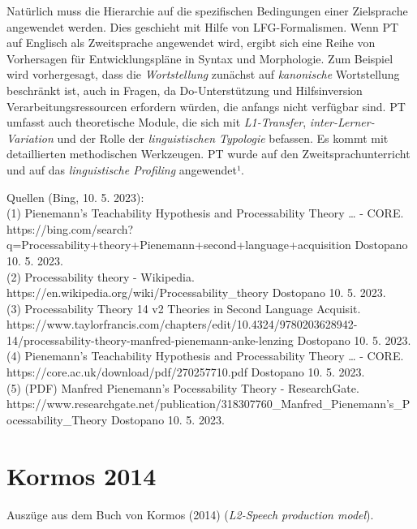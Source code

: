 \documentclass[
  letterpaper,
]{scrbook}
\begin{document}
Natürlich muss die Hierarchie auf die spezifischen Bedingungen einer
Zielsprache angewendet werden. Dies geschieht mit Hilfe von
LFG-Formalismen. Wenn PT auf Englisch als Zweitsprache angewendet wird,
ergibt sich eine Reihe von Vorhersagen für Entwicklungspläne in Syntax
und Morphologie. Zum Beispiel wird vorhergesagt, dass die
\emph{Wortstellung} zunächst auf \emph{kanonische} Wortstellung
beschränkt ist, auch in Fragen, da Do-Unterstützung und Hilfsinversion
Verarbeitungsressourcen erfordern würden, die anfangs nicht verfügbar
sind. PT umfasst auch theoretische Module, die sich mit
\emph{L1-Transfer}, \emph{inter-Lerner-Variation} und der Rolle der
\emph{linguistischen Typologie} befassen. Es kommt mit detaillierten
methodischen Werkzeugen. PT wurde auf den Zweitsprachunterricht und auf
das \emph{linguistische Profiling} angewendet¹.

Quellen (Bing, 10. 5. 2023):\\
(1) Pienemann's Teachability Hypothesis and Processability Theory
\ldots{} - CORE.
https://bing.com/search?q=Processability+theory+Pienemann+second+language+acquisition
Dostopano 10. 5. 2023.\\
(2) Processability theory - Wikipedia.
https://en.wikipedia.org/wiki/Processability\_theory Dostopano 10. 5.
2023.\\
(3) Processability Theory \textbar{} 14 \textbar{} v2 \textbar{}
Theories in Second Language Acquisit.
https://www.taylorfrancis.com/chapters/edit/10.4324/9780203628942-14/processability-theory-manfred-pienemann-anke-lenzing
Dostopano 10. 5. 2023.\\
(4) Pienemann's Teachability Hypothesis and Processability Theory
\ldots{} - CORE. https://core.ac.uk/download/pdf/270257710.pdf Dostopano
10. 5. 2023.\\
(5) (PDF) Manfred Pienemann's Pocessability Theory - ResearchGate.
https://www.researchgate.net/publication/318307760\_Manfred\_Pienemann's\_Pocessability\_Theory
Dostopano 10. 5. 2023.

\hypertarget{kormos-2014}{%
\section{Kormos 2014}\label{kormos-2014}}

Auszüge aus dem Buch von Kormos (2014) (\emph{L2-Speech production
model}).
\end{document}
